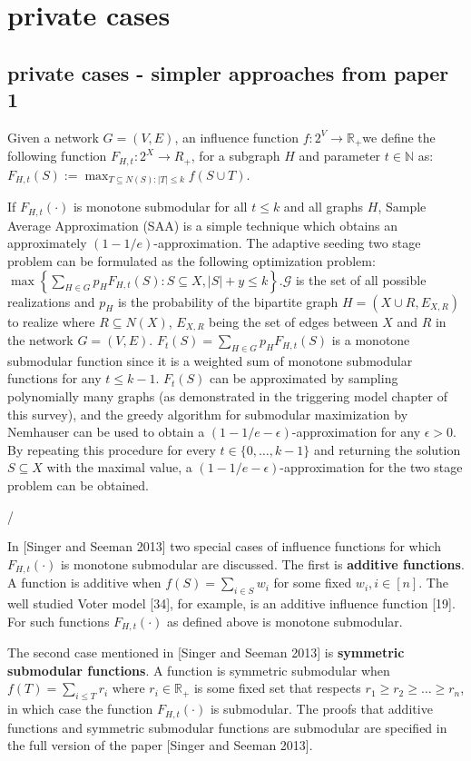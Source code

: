 
\section{private cases}
\subsection{private cases - simpler approaches from paper 1}

Given a network $G=(V,E)$, an influence function $f:2^{V}\rightarrow\mathbb{R}_{+}$we
define the following function $F_{H,t}:2^{X}\rightarrow R_{+}$, for
a subgraph $H$ and parameter $t\in\mathbb{N}$ as: $F_{H,t}(S):=\max_{T\subseteq N(S):|T|\leq k}f(S\cup T)$. 

If $F_{H,t}(\cdot)$ is monotone submodular for all $t\leq k$ and
all graphs $H$, Sample Average Approximation (SAA) is a simple technique
which obtains an approximately $(1-1/e)$-approximation. The adaptive
seeding two stage problem can be formulated as the following optimization
problem: $\max\left\{ \sum_{H\in G}p_{H}F_{H,t}(S):S\subseteq X,|S|+y\leq k\right\} $.$\mathcal{G}$
is the set of all possible realizations and $p_{H}$ is the probability
of the bipartite graph $H=(X\cup R,E_{X,R})$ to realize where $R\subseteq N(X)$,
$E_{X,R}$ being the set of edges between $X$ and $R$ in the network
$G=(V,E)$. $F_{t}(S)=\sum_{H\in G}p_{H}F_{H,t}(S)$ is a monotone
submodular function since it is a weighted sum of monotone submodular
functions for any $t\leq k-1$. $F_{t}(S)$ can be approximated by
sampling polynomially many graphs (as demonstrated in the triggering
model chapter of this survey), and the greedy algorithm for submodular
maximization by Nemhauser can be used to obtain a $(1-1/e-\epsilon)$-approximation
for any $\epsilon>0$. By repeating this procedure for every $t\in\{0,\ldots,k-1\}$
and returning the solution $S\subseteq X$ with the maximal value,
a $(1-1/e-\epsilon)$-approximation for the two stage problem can
be obtained. 

/

In {[}Singer and Seeman 2013{]} two special cases of influence functions
for which $F_{H,t}(\cdot)$ is monotone submodular are discussed.
The first is \textbf{additive functions}. A function is additive when
$f(S)=\sum_{i\in S}w_{i}$ for some fixed $w_{i},i\in[n]$. The well
studied Voter model {[}34{]}, for example, is an additive influence
function {[}19{]}. For such functions $F_{H,t}(\cdot)$ as defined
above is monotone submodular. 

The second case mentioned in {[}Singer and Seeman 2013{]} is \textbf{symmetric
submodular functions}. A function is symmetric submodular when $f(T)=\sum_{i\leq T}r_{i}$
where $r_{i}\in\mathbb{R}_{+}$ is some fixed set that respects $r_{1}\geq r_{2}\geq\ldots\geq r_{n}$,
in which case the function $F_{H,t}(\cdot)$ is submodular. The proofs
that additive functions and symmetric submodular functions are submodular
are specified in the full version of the paper {[}Singer and Seeman
2013{]}.



